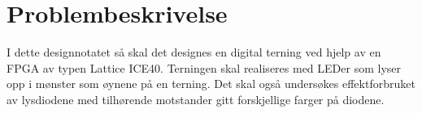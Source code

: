 \section{Problembeskrivelse}
\label{problemBeskrivelse}



I dette designnotatet så skal det designes en digital terning ved hjelp av en FPGA av typen Lattice ICE40. Terningen skal realiseres med LEDer som lyser opp i mønster som øynene på en terning. Det skal også undersøkes effektforbruket av lysdiodene med tilhørende motstander gitt forskjellige farger på diodene. 
